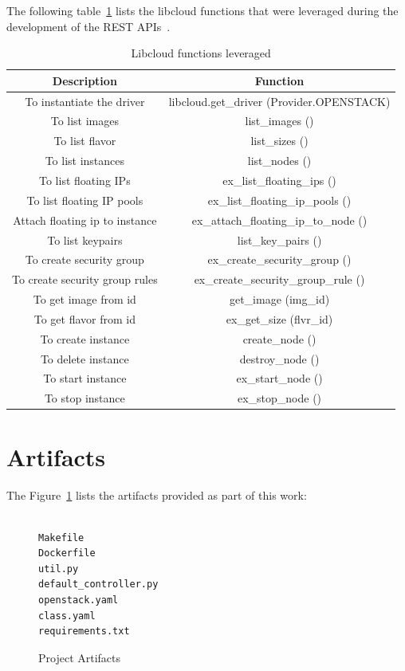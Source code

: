 The following table~\ref{tab:Description} lists the libcloud functions that 
were leveraged during the development of the REST 
APIs~\cite{hid-sp18-516-www-libcloud-functions}. 

\begin{table}[]
\centering
\caption{Libcloud functions leveraged}\label{tab:Description}
\begin{tabular}{*{2}{c}}
\toprule
Description                      & Function \\
\midrule
To instantiate the driver        & libcloud.get\_driver (Provider.OPENSTACK) \\
To list images                   & list\_images () \\
To list flavor                   & list\_sizes () \\
To list instances                & list\_nodes () \\
To list floating IPs             & ex\_list\_floating\_ips () \\
To list floating IP pools        & ex\_list\_floating\_ip\_pools () \\
Attach floating ip to instance   & ex\_attach\_floating\_ip\_to\_node () \\
To list keypairs                 & list\_key\_pairs () \\
To create security group         & ex\_create\_security\_group () \\
To create security group rules   & ex\_create\_security\_group\_rule () \\
To get image from id 	         & get\_image (img\_id) \\
To get flavor from id            & ex\_get\_size (flvr\_id) \\
To create instance               & create\_node () \\
To delete instance               & destroy\_node () \\
To start instance                & ex\_start\_node () \\
To stop instance                 & ex\_stop\_node () \\
\bottomrule
\end{tabular}
\end{table}

\section{Artifacts}

The Figure~\ref{c:project-artifacts} lists the artifacts provided as part of
this work:
\begin{figure}[htb]
\begin{verbatim}

Makefile
Dockerfile
util.py
default_controller.py
openstack.yaml
class.yaml
requirements.txt
\end{verbatim}
\caption{Project Artifacts}\label{c:project-artifacts}
\end{figure}

